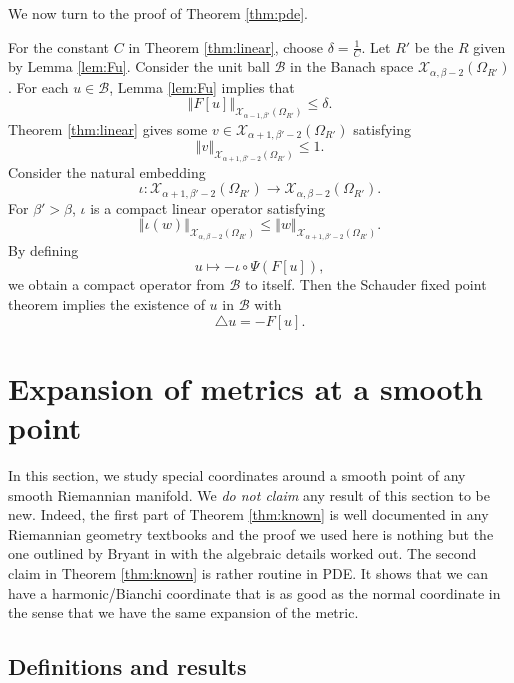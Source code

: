 \documentclass{amsart}
\newcommand{\norm}[1]{\left\Vert#1\right\Vert}
\numberwithin{equation}{section}
\begin{document}
We now turn to the proof of Theorem \ref{thm:pde}. 

For the constant $C$ in Theorem \ref{thm:linear}, choose $\delta=\frac{1}{C}$. Let $R'$ be the $R$ given by Lemma \ref{lem:Fu}. Consider the unit ball $\mathcal B$ in the Banach space $\mathcal X_{\alpha,\beta-2}(\Omega_{R'})$. For each $u\in \mathcal B$, Lemma \ref{lem:Fu} implies that
\[
	\norm{F[u]}_{\mathcal X_{\alpha-1,\beta'}(\Omega_{R'})}\leq \delta.
\]
Theorem \ref{thm:linear} gives some $v\in \mathcal X_{\alpha+1,\beta'-2}(\Omega_{R'})$ satisfying
\[
	\norm{v}_{\mathcal X_{\alpha+1,\beta'-2}(\Omega_{R'})}\leq 1.
\]
Consider the natural embedding
\[
	\iota: \mathcal X_{\alpha+1,\beta'-2}(\Omega_{R'})\to \mathcal X_{\alpha,\beta-2}(\Omega_{R'}).
\]
For $\beta'>\beta$, $\iota$ is a compact linear operator satisfying
\[
	\norm{\iota(w)}_{\mathcal X_{\alpha,\beta-2}(\Omega_{R'})}\leq \norm{w}_{\mathcal X_{\alpha+1,\beta'-2}(\Omega_{R'})}.
\]
By defining
\[
	u\mapsto - \iota\circ \Psi (F[u]),
\]
we obtain a compact operator from $\mathcal B$ to itself. Then the Schauder fixed point theorem implies the existence of $u$ in $\mathcal B$ with
\[
	\triangle u = - F[u].
\]

\section{Expansion of metrics at a smooth point}\label{sec:smooth}

In this section, we study special coordinates around a smooth point of any smooth Riemannian manifold. We {\it do not claim} any result of this section to be new. Indeed, the first part of Theorem \ref{thm:known} is well documented in any Riemannian geometry textbooks and the proof we used here is nothing but the one outlined by Bryant in \cite{web} with the algebraic details worked out. The second claim in Theorem \ref{thm:known} is rather routine in PDE. It shows that we can have a harmonic/Bianchi coordinate that is as good as the normal coordinate in the sense that we have the same expansion of the metric.

\subsection{Definitions and results}
\end{document}
